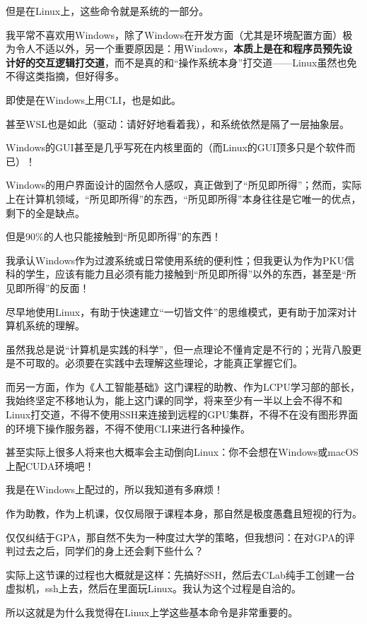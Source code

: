 \documentclass[12pt]{ctexart}
\begin{document}
但是在Linux上，这些命令就是系统的一部分。

我平常不喜欢用Windows，除了Windows在开发方面（尤其是环境配置方面）极为令人不适以外，另一个重要原因是：用Windows，\textbf{本质上是在和程序员预先设计好的交互逻辑打交道}，而不是真的和“操作系统本身”打交道——Linux虽然也免不得这类指摘，但好得多。

即使是在Windows上用CLI，也是如此。

甚至WSL也是如此（驱动：请好好地看着我），和系统依然是隔了一层抽象层。

Windows的GUI甚至是几乎写死在内核里面的（而Linux的GUI顶多只是个软件而已）！

Windows的用户界面设计的固然令人感叹，真正做到了“所见即所得”；然而，实际上在计算机领域，“所见即所得”的东西，“所见即所得”本身往往是它唯一的优点，剩下的全是缺点。

但是90\%的人也只能接触到“所见即所得”的东西！

我承认Windows作为过渡系统或日常使用系统的便利性；但我更认为作为PKU信科的学生，应该有能力且必须有能力接触到“所见即所得”以外的东西，甚至是“所见即所得”的反面！

尽早地使用Linux，有助于快速建立“一切皆文件”的思维模式，更有助于加深对计算机系统的理解。

虽然我总是说“计算机是实践的科学”，但一点理论不懂肯定是不行的；光背八股更是不可取的。必须要在实践中去理解这些理论，才能真正掌握它们。

而另一方面，作为《人工智能基础》这门课程的助教、作为LCPU学习部的部长，我始终坚定不移地认为，能上这门课的同学，将来至少有一半以上会不得不和Linux打交道，不得不使用SSH来连接到远程的GPU集群，不得不在没有图形界面的环境下操作服务器，不得不使用CLI来进行各种操作。

甚至实际上很多人将来也大概率会主动倒向Linux：你不会想在Windows或macOS上配CUDA环境吧！

我是在Windows上配过的，所以我知道有多麻烦！

作为助教，作为上机课，仅仅局限于课程本身，那自然是极度愚蠢且短视的行为。

仅仅纠结于GPA，那自然不失为一种度过大学的策略，但我想问：在对GPA的评判过去之后，同学们的身上还会剩下些什么？

实际上这节课的过程也大概就是这样：先搞好SSH，然后去CLab纯手工创建一台虚拟机，ssh上去，然后在里面玩Linux。我认为这个过程是自洽的。

所以这就是为什么我觉得在Linux上学这些基本命令是非常重要的。
\end{document}
